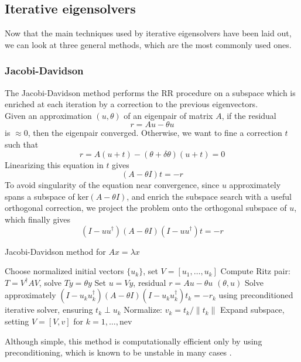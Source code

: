 \subsection{Iterative eigensolvers}
Now that the main techniques used by iterative eigensolvers have been laid out, we can look at three general methods, which are the most commonly used ones.
\subsubsection{Jacobi-Davidson}
The Jacobi-Davidson method \cite{JacobiDavidson} performs the RR procedure on a subspace which is enriched at each iteration by a correction to the previous eigenvectors.
\\Given an approximation $(u, \theta)$ of an eigenpair of matrix $A$, if the residual
\begin{equation}
    \label{eq:residual}
    r= A u - \theta u
\end{equation}
is $\approx 0$, then the eigenpair converged. Otherwise, we want to fine a correction $t$ such that 
\begin{equation}
    \label{eq:jacobi_correction}
    r= A(u+t) - (\theta + \delta \theta) (u+t) = 0 
\end{equation}
Linearizing this equation in $t$ gives
\begin{equation}
   (A - \theta  I ) t = -r 
\end{equation}
To avoid singularity of the equation near convergence, since $u$ approximately spans a subspace of $\text{ker} (A-\theta I)$, and enrich the subspace search with a useful orthogonal correction, we project the problem onto the orthogonal subspace of $u$, which finally gives
\begin{equation}
    \label{eq:jacobi_eq_proj}
    ( I - uu^\dagger) (A - \theta  I )(I - u u^\dagger) t = -r
\end{equation}
\begin{algorithm}[H]
\caption{Jacobi-Davidson method for $A x = \lambda x$}
\begin{algorithmic}[1]
\STATE Choose normalized initial vectors $\{u_k\}$, set $V = [u_1, \ldots, u_{k}]$
\REPEAT
    \STATE Compute Ritz pair: $T = V^\dagger A V$, solve $T y = \theta y$
    \STATE Set $u = V y$, residual $r = A u - \theta u$
         \RETURN $(\theta, u)$
    \ENDIF
    \STATE Solve approximately $(I - u_k u_k^\dagger)(A - \theta I)(I - u_k u_k^\dagger) t_k = -r_k$
        using preconditioned iterative solver, ensuring $t_k \perp u_k$
    \STATE Normalize: $v_k = t_k / \|t_k\|$
    \STATE Expand subspace, setting $V = [V, v]$
for $k = 1, \dots, \text{nev}$
\end{algorithmic}
\end{algorithm}
Although simple, this method is computationally efficient only by using preconditioning, which is known to be unstable in many cases \cite{Saad1992}.
